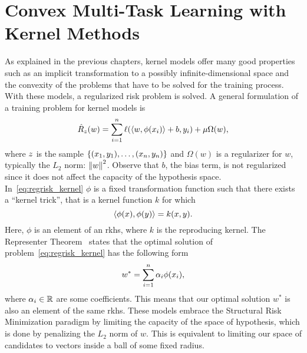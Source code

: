 \section{Convex Multi-Task Learning with Kernel Methods}\label{sec:convexmlt_kernel}
As explained in the previous chapters, kernel models offer many good properties such as an implicit transformation to a possibly infinite-dimensional space and the convexity of the problems that have to be solved for the training process. With these models, a regularized risk problem is solved.
A general formulation of a training problem for kernel models is 
\begin{equation}
    \label{eq:regrisk_kernel}
    \emprisk({w}) = \sum_{i=1}^{\nsamples} \lossf(\dotp{w}{\phi({x}_i)} + b, y_i) + \mu \Omega({w}) ,
\end{equation}
where $z$ is the sample $\{(x_1, y_1), \ldots, (x_n, y_n)\}$ and $\Omega(w)$ is a regularizer for ${w}$, typically the $L_2$ norm: $\left\lVert w\right\rVert^2$. Observe that $b$, the bias term, is not regularized since it does not affect the capacity of the hypothesis space.
In~\eqref{eq:regrisk_kernel} $\phi$ is a fixed transformation function such that there exists a ``kernel trick'', that is a kernel function $k$ for which
\begin{equation}
    \nonumber
    \left\langle \phi(x), \phi(y) \right\rangle = k(x, y).
\end{equation}
Here, $\phi$ is an element of an \acrshort{rkhs}, where $k$ is the reproducing kernel. 
The Representer Theorem~\citep*{ScholkopfHS01} states that the optimal solution of problem~\eqref{eq:regrisk_kernel} has the following form
\begin{equation}
    \nonumber
    w^* = \sum_{i=1}^n \alpha_i \phi(x_i) ,
\end{equation}
where $\alpha_i \in \mathbb{R}$ are some coefficients. This means that our optimal solution $w^*$ is also an element of the same \acrshort{rkhs}.
These models embrace the Structural Risk Minimization paradigm by limiting the capacity of the space of hypothesis, which is done by penalizing the $L_2$ norm of $w$. This is equivalent to limiting our space of candidates to vectors inside a ball of some fixed radius.

